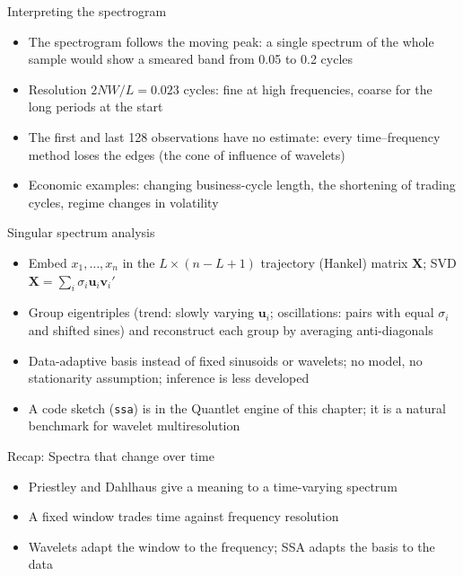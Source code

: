 \begin{frame}{Interpreting the spectrogram}
\itemsize{\small}
\begin{itemize}
    \item The spectrogram follows the moving peak: a single spectrum of the whole sample would show a smeared band from 0.05 to 0.2 cycles
    \item Resolution $2NW/L = 0.023$ cycles: fine at high frequencies, coarse for the long periods at the start
    \item The first and last 128 observations have no estimate: every time--frequency method loses the edges (the cone of influence of wavelets)
    \item Economic examples: changing business-cycle length, the shortening of trading cycles, regime changes in volatility
\end{itemize}
\end{frame}

\begin{frame}{Singular spectrum analysis}
\itemsize{\small}
\begin{itemize}
    \item Embed $x_1, \dots, x_n$ in the $L \times (n - L + 1)$ trajectory (Hankel) matrix $\mathbf X$; SVD $\mathbf X = \sum_i\sigma_i\mathbf u_i\mathbf v_i'$ 
    \item Group eigentriples (trend: slowly varying $\mathbf u_i$; oscillations: pairs with equal $\sigma_i$ and shifted sines) and reconstruct each group by averaging anti-diagonals
    \item Data-adaptive basis instead of fixed sinusoids or wavelets; no model, no stationarity assumption; inference is less developed
    \item A code sketch (\texttt{ssa}) is in the Quantlet engine of this chapter; it is a natural benchmark for wavelet multiresolution
\end{itemize}
\end{frame}

\begin{frame}{Recap: Spectra that change over time}
\itemsize{\small}
\begin{itemize}
    \item Priestley and Dahlhaus give a meaning to a time-varying spectrum
    \item A fixed window trades time against frequency resolution
    \item Wavelets adapt the window to the frequency; SSA adapts the basis to the data
\end{itemize}
\end{frame}


